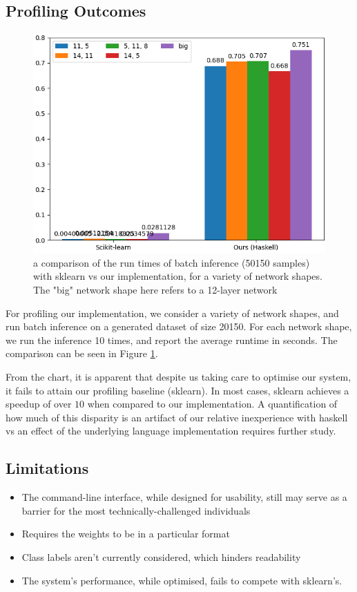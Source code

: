 \documentclass[12pt, titlepage]{article}
\begin{document}
\subsection{Profiling Outcomes}
\begin{figure}
	\includegraphics[width=\textwidth]{../images/benchmark.png}
	\caption{\centering \label{fig:4}a comparison of the run times of batch inference (50150 samples) with sklearn vs our implementation, for a variety of network shapes. The "big" network shape here refers to a 12-layer network}
\end{figure}
For profiling our implementation, we consider a variety of network shapes, and run batch inference on a generated dataset of size 20150. For each network shape, we run the inference 10 times, and report the average runtime in seconds. The comparison can be seen in Figure \ref{fig:4}.\bigskip

From the chart, it is apparent that despite us taking care to optimise our system, it fails to attain our profiling baseline (sklearn). In most cases, sklearn achieves a speedup of over $10$ when compared to our implementation. A quantification of how much of this disparity is an artifact of our relative inexperience with haskell vs an effect of the underlying language implementation requires further study.

\subsection{Limitations}
\begin{itemize}
	\item The command-line interface, while designed for usability, still may serve as a barrier for the most technically-challenged individuals
	\item Requires the weights to be in a particular format
	\item Class labels aren't currently considered, which hinders readability
	\item The system's performance, while optimised, fails to compete with sklearn's.
\end{itemize}
\end{document}
